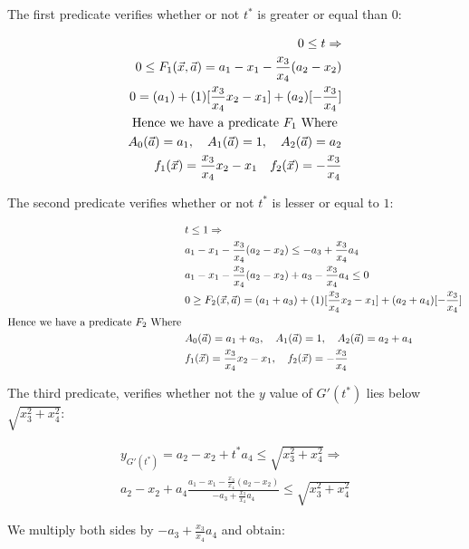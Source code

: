 \documentclass[UKenglish]{lipics-v2019}
\begin{document}
The first predicate verifies whether or not $t^*$ is greater or equal than $0$:

\begin{align*}
    0 \le t \Rightarrow \\
   0 \le F_1(\vec{x}, \vec{a}) = a_1 - x_1 - \frac{x_3}{x_4} (a_2 - x_2)  \\
    0 = (a_1) + (1)[\frac{x_3}{x_4}x_2 - x_1] + (a_2) [ - \frac{x_3}{x_4} ] \\
    \textnormal{Hence we have a predicate } F_1 \textnormal{ Where }\\
    A_0(\vec{a}) = a_1, \quad A_1(\vec{a}) = 1,\quad A_2(\vec{a}) = a_2 \\
    f_1(\vec{x}) = \frac{x_3}{x_4}x_2 - x_1 \quad f_2(\vec{x}) = - \frac{x_3}{x_4}
\end{align*}

The second predicate verifies whether or not $t^*$ is lesser or equal to $1$:

\begin{align*}
    &t \le 1 \Rightarrow \\
    & a_1 - x_1 - \frac{x_3}{x_4} (a_2 - x_2) \le  - a_3 + \frac{x_3}{x_4}a_4 \\
    & a_1 - x_1 - \frac{x_3}{x_4} (a_2 - x_2) + a_3 - \frac{x_3}{x_4}a_4 \le 0 \\
    &0 \ge F_2(\vec{x}, \vec{a}) = (a_1 + a_3) + (1)[\frac{x_3}{x_4}x_2- x_1] + (a_2 + a_4) [ - \frac{x_3}{x_4} ] \\
    \textnormal{Hence we have a predicate } F_2 \textnormal{ Where } \\
    &A_0(\vec{a}) = a_1 + a_3, \quad A_1(\vec{a}) = 1,\quad A_2(\vec{a}) = a_2 + a_4 \\
    &f_1(\vec{x}) = \frac{x_3}{x_4}x_2- x_1,\quad f_2(\vec{x}) = - \frac{x_3}{x_4}
\end{align*}

The third predicate, verifies whether not the $y$ value of $G'(t^*)$ lies below $\sqrt{x_3^2 + x_4^2}$:

\begin{align*}
    y_{G'(t^*)} = a_2 - x_2 + t^* a_4   \le \sqrt{x_3^2 + x_4^2} \Rightarrow \\
    a_2 - x_2 + a_4 \frac{   a_1 - x_1 - \frac{x_3}{x_4} (a_2 - x_2)}{ - a_3 + \frac{x_3}{x_4}a_4} \le \sqrt{x_3^2 + x_4^2} 
\end{align*}

We multiply both sides by $- a_3 + \frac{x_3}{x_4}a_4$ and obtain:
\end{document}
